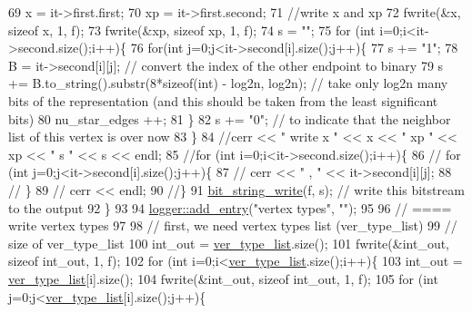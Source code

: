 \begin{DoxyCode}
69     x = it->first.first;
70     xp = it->first.second;
71     \textcolor{comment}{//write x and xp}
72     fwrite(&x, \textcolor{keyword}{sizeof} x, 1, f);
73     fwrite(&xp, \textcolor{keyword}{sizeof} xp, 1, f);
74     s = \textcolor{stringliteral}{""};
75     \textcolor{keywordflow}{for} (\textcolor{keywordtype}{int} i=0;i<it->second.size();i++)\{
76       \textcolor{keywordflow}{for}(\textcolor{keywordtype}{int} j=0;j<it->second[i].size();j++)\{
77         s += \textcolor{stringliteral}{"1"};
78         B = it->second[i][j]; \textcolor{comment}{// convert the index of the other endpoint to binary}
79         s += B.to\_string().substr(8*\textcolor{keyword}{sizeof}(\textcolor{keywordtype}{int}) - log2n, log2n); \textcolor{comment}{// take only log2n many bits of the
       representation (and this should be taken from the least significant bits)}
80         nu\_star\_edges ++;
81       \}
82       s += \textcolor{stringliteral}{"0"}; \textcolor{comment}{// to indicate that the neighbor list of this vertex is over now}
83     \}
84     \textcolor{comment}{//cerr << " write  x " << x << " xp " << xp << " s " << s << endl;}
85     \textcolor{comment}{//for (int i=0;i<it->second.size();i++)\{}
86     \textcolor{comment}{//  for (int j=0;j<it->second[i].size();j++)\{}
87     \textcolor{comment}{//    cerr << " , " << it->second[i][j];}
88     \textcolor{comment}{//  \}}
89     \textcolor{comment}{//  cerr << endl;}
90     \textcolor{comment}{//\}}
91     \hyperlink{compression__helper_8cpp_accfebfd921b967c2f09e8c11569eb832}{bit\_string\_write}(f, s); \textcolor{comment}{// write this bitstream to the output}
92   \}
93 
94   \hyperlink{classlogger_a710163deb17bc81f70d53d285b8ac9ac}{logger::add\_entry}(\textcolor{stringliteral}{"vertex types"}, \textcolor{stringliteral}{""});
95 
96   \textcolor{comment}{// ==== write vertex types}
97 
98   \textcolor{comment}{// first, we need vertex types list (ver\_type\_list)}
99   \textcolor{comment}{// size of ver\_type\_list}
100   int\_out = \hyperlink{classmarked__graph__compressed_af2e3e55223d436628a02758dfae88493}{ver\_type\_list}.size();
101   fwrite(&int\_out, \textcolor{keyword}{sizeof} int\_out, 1, f);
102   \textcolor{keywordflow}{for} (\textcolor{keywordtype}{int} i=0;i<\hyperlink{classmarked__graph__compressed_af2e3e55223d436628a02758dfae88493}{ver\_type\_list}.size();i++)\{
103     int\_out = \hyperlink{classmarked__graph__compressed_af2e3e55223d436628a02758dfae88493}{ver\_type\_list}[i].size();
104     fwrite(&int\_out, \textcolor{keyword}{sizeof} int\_out, 1, f);
105     \textcolor{keywordflow}{for} (\textcolor{keywordtype}{int} j=0;j<\hyperlink{classmarked__graph__compressed_af2e3e55223d436628a02758dfae88493}{ver\_type\_list}[i].size();j++)\{

\end{DoxyCode}
